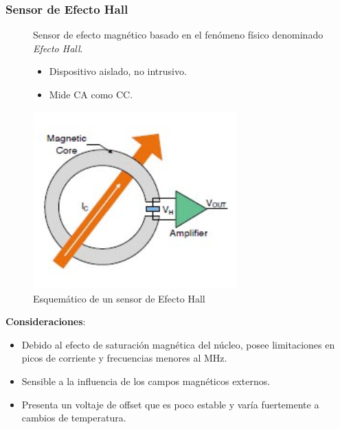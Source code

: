 \documentclass[10pt]{beamer}
\theoremstyle{remark}
\theoremstyle{definition}
\begin{document}
\begin{frame}[allowframebreaks]
  \frametitle{Sensor de Efecto Hall}
  \begin{figure}[h!]
	\begin{minipage}{0.45\textwidth}
		Sensor de efecto magnético basado en el fenómeno físico denominado \emph{Efecto Hall}.
	  \begin{itemize}		  
		\item Dispositivo aislado, no intrusivo.
		\item Mide CA como CC.
	  \end{itemize}
	\end{minipage}
	\hspace{10pt}
	\begin{minipage}{0.45\textwidth}
	  \centering
	  \includegraphics[width=0.7\textwidth]{./images/Open-loop_Hall_Sensor.jpg}
	  \caption{Esquemático de un sensor de Efecto Hall}
	  \label{sch_hall}
	\end{minipage}
  \end{figure}

  \textbf{Consideraciones}:
  \begin{itemize}
	\item Debido al efecto de saturación magnética del núcleo, posee
	  limitaciones en picos de corriente y frecuencias menores al MHz.
	\item Sensible a la influencia de los campos magnéticos externos.
	\item Presenta un voltaje de offset que es poco estable y varía
	  fuertemente a cambios de temperatura.
  \end{itemize}
\end{frame}
\end{document}
